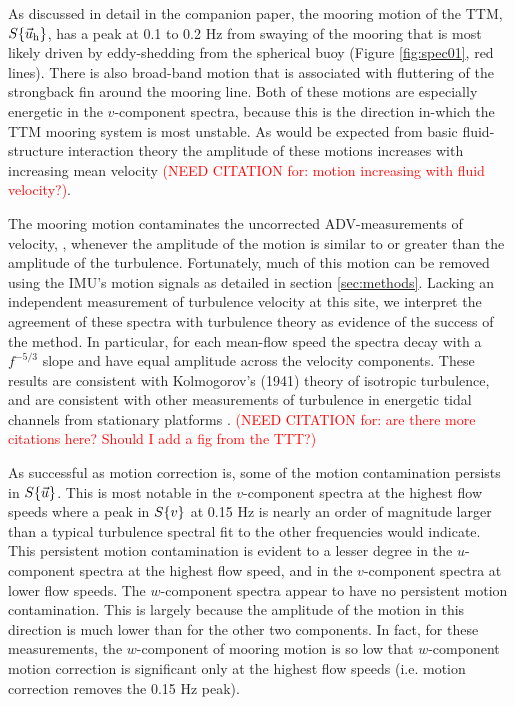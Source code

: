 \documentclass[twocol]{ametsoc}
\newcommand{\citeneeded}[1]{\textcolor{red}{(NEED CITATION for: #1)}}
\begin{document}
As discussed in detail in the companion paper, the mooring motion of the TTM, $S\{\vec{u}_\mathrm{h}\}$, has a peak at 0.1 to 0.2 Hz from swaying of the mooring that is most likely driven by eddy-shedding from the spherical buoy (Figure \ref{fig:spec01}, red lines). There is also broad-band motion that is associated with fluttering of the strongback fin around the mooring line. Both of these motions are especially energetic in the $v$-component spectra, because this is the direction in-which the TTM mooring system is most unstable. As would be expected from basic fluid-structure interaction theory the amplitude of these motions increases with increasing mean velocity \citeneeded{motion increasing with fluid velocity?}.

The mooring motion contaminates the uncorrected ADV-measurements of velocity, \spec{\umeas}, whenever the amplitude of the motion is similar to or greater than the amplitude of the turbulence. Fortunately, much of this motion can be removed using the IMU's motion signals as detailed in section \ref{sec:methods}. Lacking an independent measurement of turbulence velocity at this site, we interpret the agreement of these spectra with turbulence theory as evidence of the success of the method. In particular, for each mean-flow speed the spectra decay with a $f^{-5/3}$ slope and have equal amplitude across the velocity components. These results are consistent with Kolmogorov's (1941) theory of isotropic turbulence, and are consistent with other measurements of turbulence in energetic tidal channels from stationary platforms \citep[]{Kolmogorov1941c,Thomson++2010}.  \citeneeded{are there more citations here? Should I add a fig from the TTT?}

As successful as motion correction is, some of the motion contamination persists in $S\{\vec{u}\}$. This is most notable in the $v$-component spectra at the highest flow speeds where a peak in $S\{v\}$ at 0.15 Hz is nearly an order of magnitude larger than a typical turbulence spectral fit to the other frequencies would indicate. This persistent motion contamination is evident to a lesser degree in the $u$-component spectra at the highest flow speed, and in the $v$-component spectra at lower flow speeds.  The $w$-component spectra appear to have no persistent motion contamination. This is largely because the amplitude of the motion in this direction is much lower than for the other two components. In fact, for these measurements, the $w$-component of mooring motion is so low that $w$-component motion correction is significant only at the highest flow speeds (i.e. motion correction removes the 0.15 Hz peak).
\end{document}
